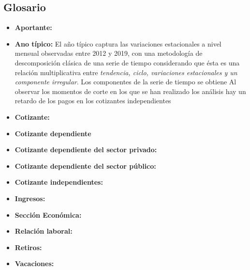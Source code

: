 \FloatBarrier
\subsection{Glosario}\label{fig:anexo:glosario}

\begin{itemize}
    \item \textbf{Aportante:}
    \item \textbf{Ano típico:} El año típico captura las variaciones estacionales a nivel mensual observadas entre 2012 y 2019, con una metodología de descomposición clásica de una serie de tiempo considerando que ésta es una relación multiplicativa entre \textit{tendencia, ciclo, variaciones estacionales y un componente irregular}. Los componentes de la serie de tiempo se obtiene Al observar los momentos de corte en los que se han realizado los análisis hay un retardo de los pagos en los cotizantes independientes
    \item \textbf{Cotizante:} 
    \item \textbf{Cotizante dependiente}
    \item \textbf{Cotizante dependiente del sector privado:}     
    \item \textbf{Cotizante dependiente del sector público:}     
    \item \textbf{Cotizante independientes:}     
    \item \textbf{Ingresos:}    
    \item \textbf{Sección Económica:}         
    \item \textbf{Relación laboral:} 
    \item \textbf{Retiros:}    
    \item \textbf{Vacaciones:}
\end{itemize}



